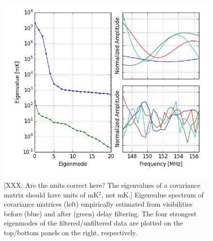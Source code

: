\documentclass[twocolumn,numberedappendix]{emulateapj} \shorttitle{PSA64}
\begin{document}
\begin{figure}\centering
\includegraphics[width=\columnwidth]{plots/eig.png}
\caption{
[XXX: Are the units correct here? The eigenvalues of a covariance matrix should
have units of mK$^2$, not mK.]
Eigenvalue spectrum of covariance matrices (left) empirically estimated 
from visibilities before (blue) and after (green) delay filtering.
The four strongest eigenmodes of the filtered/unfiltered data are plotted
on the top/bottom panels on the right, respectively.
} \label{fig:eigs}
\end{figure}
\end{document}
